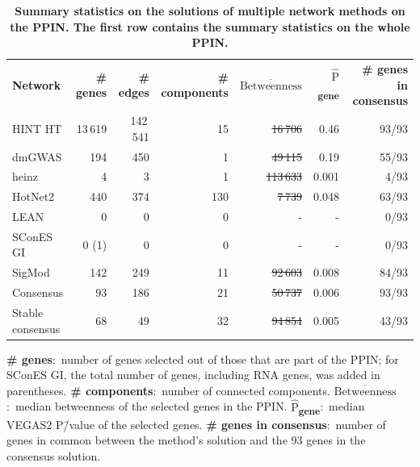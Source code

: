 \documentclass[10pt,letterpaper]{article}
\newlength\savedwidth
\newcommand\thickhline{\noalign{\global\savedwidth\arrayrulewidth\global\arrayrulewidth 2pt}%
\hline
\noalign{\global\arrayrulewidth\savedwidth}}
\newcommand{\mean}[1]{$\overline{\mbox{#1}}$}
\newcommand{\median}[1]{$\hat{\mbox{#1}}$}
\providecommand{\DIFaddtex}[1]{{\protect\color{blue}\uwave{#1}}} %
\providecommand{\DIFdeltex}[1]{{\protect\color{red}\sout{#1}}}                      %
\providecommand{\DIFaddFL}[1]{\DIFadd{#1}} %
\providecommand{\DIFdelFL}[1]{\DIFdel{#1}} %
\providecommand{\DIFaddbeginFL}{} %
\providecommand{\DIFaddendFL}{} %
\providecommand{\DIFdelbeginFL}{} %
\providecommand{\DIFdelendFL}{} %
\providecommand{\DIFadd}[1]{\texorpdfstring{\DIFaddtex{#1}}{#1}} %
\providecommand{\DIFdel}[1]{\texorpdfstring{\DIFdeltex{#1}}{}} %
\newcommand{\DIFscaledelfig}{0.5}
\newlength{\DIFdelgraphicswidth} %
\newlength{\DIFdelgraphicsheight} %
\newcommand{\DIFaddincludegraphics}[2][]{{\color{blue}\fbox{\DIFOincludegraphics[#1]{#2}}}} %
\newcommand{\DIFdelincludegraphics}[2][]{%
\sbox{\DIFdelgraphicsbox}{\DIFOincludegraphics[#1]{#2}}%
\settoboxwidth{\DIFdelgraphicswidth}{\DIFdelgraphicsbox} %
\settoboxtotalheight{\DIFdelgraphicsheight}{\DIFdelgraphicsbox} %
\scalebox{\DIFscaledelfig}{%
\parbox[b]{\DIFdelgraphicswidth}{\usebox{\DIFdelgraphicsbox}\\[-\baselineskip] \rule{\DIFdelgraphicswidth}{0em}}\llap{\resizebox{\DIFdelgraphicswidth}{\DIFdelgraphicsheight}{%
\setlength{\unitlength}{\DIFdelgraphicswidth}%
\begin{picture}(1,1)%
\thicklines\linethickness{2pt} %
{\color[rgb]{1,0,0}\put(0,0){\framebox(1,1){}}}%
{\color[rgb]{1,0,0}\put(0,0){\line( 1,1){1}}}%
{\color[rgb]{1,0,0}\put(0,1){\line(1,-1){1}}}%
\end{picture}%
}\hspace*{3pt}}} %
} %
\DeclareRobustCommand{\DIFaddbeginFL}{\DIFOaddbeginFL \let\includegraphics\DIFaddincludegraphics} %
\DeclareRobustCommand{\DIFaddendFL}{\DIFOaddendFL \let\includegraphics\DIFOincludegraphics} %
\DeclareRobustCommand{\DIFdelbeginFL}{\DIFOdelbeginFL \let\includegraphics\DIFdelincludegraphics} %
\DeclareRobustCommand{\DIFdelendFL}{\DIFOaddendFL \let\includegraphics\DIFOincludegraphics} %
\begin{document}
\begin{table}[!ht]
  \begin{adjustwidth}{-2.25in}{0in} %
  \centering
  \caption{
  {\bf Summary statistics on the solutions of multiple network methods on the PPIN. The first row contains the summary statistics on the whole PPIN.}}
  \begin{tabular}{lrrrrrr}
  {\bf Network } & {\bf \# genes } & {\bf \# edges } & {\bf \# components } & {\bf \mean{Betweenness} } & {\bf \median{P}\textsubscript{gene} } & {\bf \# genes in consensus } \\
  \thickhline
  HINT HT           & 13\,619 & 142\,541  & 15  & \DIFdelbeginFL \DIFdelFL{16\,706   }\DIFdelendFL \DIFaddbeginFL \DIFaddFL{$1.8 \times 10^{-4}$ }\DIFaddendFL & 0.46  & 93/93 \\
  \hline
  dmGWAS            & 194     & 450       & 1   & \DIFdelbeginFL \DIFdelFL{49\,115   }\DIFdelendFL \DIFaddbeginFL \DIFaddFL{$5.3 \times 10^{-4}$ }\DIFaddendFL & 0.19  & 55/93 \\
  heinz             & 4       & 3         & 1   & \DIFdelbeginFL \DIFdelFL{113\,633  }\DIFdelendFL \DIFaddbeginFL \DIFaddFL{$1.2 \times 10^{-3}$ }\DIFaddendFL & 0.001 & 4/93  \\
  HotNet2           & 440     & 374       & 130 & \DIFdelbeginFL \DIFdelFL{7\,739    }\DIFdelendFL \DIFaddbeginFL \DIFaddFL{$8.3 \times 10^{-5}$ }\DIFaddendFL & 0.048 & 63/93 \\
  LEAN              & 0       & 0         & 0   & -         & -     & 0/93  \\
  SConES GI         & 0 (1)   & 0         & 0   & -         & -     & 0/93  \\
  SigMod            & 142     & 249       & 11  & \DIFdelbeginFL \DIFdelFL{92\,603   }\DIFdelendFL \DIFaddbeginFL \DIFaddFL{$1 \times 10^{-3}$   }\DIFaddendFL & 0.008 & 84/93 \\
  \hline
  Consensus         & 93      & 186       & 21  & \DIFdelbeginFL \DIFdelFL{50\,737   }\DIFdelendFL \DIFaddbeginFL \DIFaddFL{$5.5 \times 10^{-4}$ }\DIFaddendFL & 0.006 & 93/93 \\
  Stable consensus  & 68      & 49        & 32  & \DIFdelbeginFL \DIFdelFL{94\,854   }\DIFdelendFL \DIFaddbeginFL \DIFaddFL{$1 \times 10^{-3}$   }\DIFaddendFL & 0.005 & 43/93 \\
  \end{tabular}
  \begin{flushleft} \textbf{\# genes}:~number of genes selected out of those that are part of the PPIN; for SConES GI, the total number of genes, including RNA genes, was added in parentheses. \textbf{\# components}:~number of connected components. \textbf{\mean{Betweenness}}:~median \DIFaddbeginFL \DIFaddFL{(normalized) }\DIFaddendFL betweenness of the selected genes in the PPIN. \textbf{\median{P}\textsubscript{gene}}:~median VEGAS2 P\=/value of the selected genes. \textbf{\# genes in consensus}:~number of genes in common between the method's solution and the 93 genes in the consensus solution.

\end{flushleft}
\end{adjustwidth}
\end{table}
\end{document}
